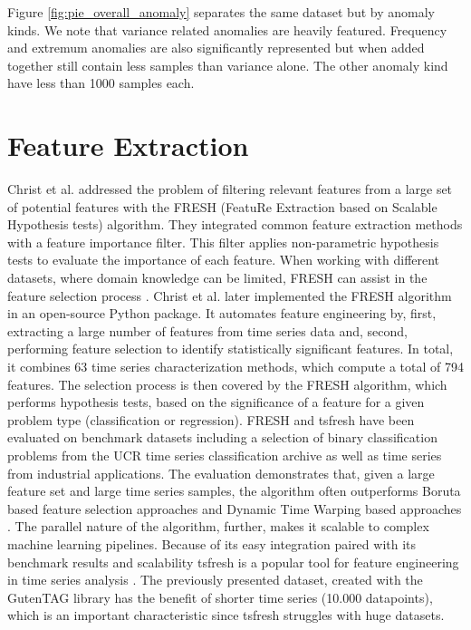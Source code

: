 Figure \ref{fig:pie_overall_anomaly} separates the same dataset but by anomaly kinds. We note that variance related anomalies are heavily featured. Frequency and extremum anomalies are also significantly represented but when added together still contain less samples than variance alone. The other anomaly kind have less than 1000 samples each. 


\section{Feature Extraction}
Christ et al. addressed the problem of filtering relevant features from a large set of potential features with the FRESH (FeatuRe Extraction based on Scalable Hypothesis tests) algorithm. They integrated common feature extraction methods with a feature importance filter. This filter applies non-parametric hypothesis tests to evaluate the importance of each feature. When working with different datasets, where domain knowledge can be limited, FRESH can assist in the feature selection process \cite{fresh}. 
Christ et al. later implemented the FRESH algorithm in an open-source Python package. It automates feature engineering by, first, extracting a large number of features from time series data and, second, performing feature selection to identify statistically significant features. In total, it combines 63 time series characterization methods, which compute a total of 794 features. The selection process is then covered by the FRESH algorithm, which performs hypothesis tests, based on the significance of a feature for a given problem type (classification or regression). 
FRESH and tsfresh have been evaluated on benchmark datasets including a selection of binary classification problems from the UCR time series classification archive \cite{UCRArchive2018} as well as time series from industrial applications. The evaluation demonstrates that, given a large feature set and large time series samples, the algorithm often outperforms Boruta \cite{boruta} based feature selection approaches \cite{boruta_ex1} and Dynamic Time Warping \cite{dtw} based approaches \cite{dtw_ex1, dtw_ex2}. The parallel nature of the algorithm, further, makes it scalable to complex machine learning pipelines. Because of its easy integration paired with its benchmark results and scalability tsfresh is a popular tool for feature engineering in time series analysis \cite{tsfresh_ex1,tsfresh_ex2,tsfresh_ex3,tsfresh_ex4,tsfresh_ex5}. 
The previously presented dataset, created with the GutenTAG library has the benefit of shorter time series (10.000 datapoints), which is an important characteristic since  tsfresh struggles with huge datasets.

